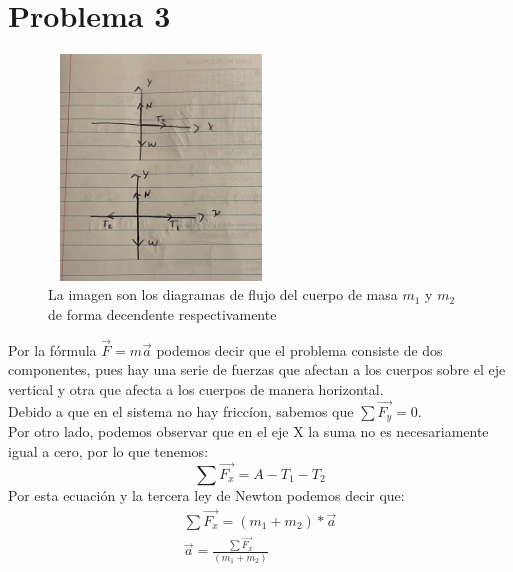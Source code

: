 \documentclass[letterpaper,12pt]{article}
\begin{document}
\section*{Problema 3}
\begin{figure}[htb]
    \centering
    \includegraphics[width=6cm,height=6cm]{Imagenes/Diagramas_cl.jpeg}
    \caption{La imagen son los diagramas de flujo del cuerpo de masa $m_1$ y $m_2$ de forma decendente respectivamente}
    \label{Imagen:Diagramas de flujo }
\end{figure}
Por la fórmula $\Vec{F}=m\Vec{a}$ podemos decir que el problema consiste de dos componentes, pues hay una serie de fuerzas que afectan a los cuerpos sobre el eje vertical y otra que afecta a los cuerpos de manera horizontal.\\
Debido a que en el sistema no hay friccíon, sabemos que $\sum \Vec{F_y}=0$.\\
Por otro lado, podemos observar que en el eje X la suma no es necesariamente igual a cero, por lo que tenemos:
\begin{equation*}
    \sum \Vec{F_x}=A-T_1-T_2
\end{equation*}
Por esta ecuación y la tercera ley de Newton podemos decir que:
\begin{align*}
    \sum \Vec{F_x}=(m_1+m_2)*\Vec{a}\\
    \Vec{a}=\frac{\sum \Vec{F_x}}{(m_1+m_2)}
\end{align*}
\end{document}
